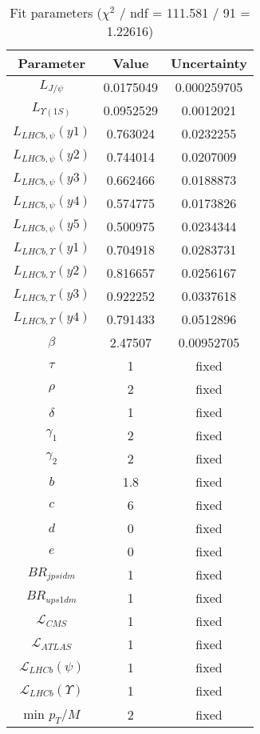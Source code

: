\begin{table}
\centering
\begin{tabular}{c|c|c}
Parameter & Value & Uncertainty \\
\hline
$L_{J/\psi}$ & 0.0175049 & 0.000259705 \\
$L_{\Upsilon(1S)}$ & 0.0952529 & 0.0012021 \\
$L_{LHCb,\psi}(y1)$ & 0.763024 & 0.0232255 \\
$L_{LHCb,\psi}(y2)$ & 0.744014 & 0.0207009 \\
$L_{LHCb,\psi}(y3)$ & 0.662466 & 0.0188873 \\
$L_{LHCb,\psi}(y4)$ & 0.574775 & 0.0173826 \\
$L_{LHCb,\psi}(y5)$ & 0.500975 & 0.0234344 \\
$L_{LHCb,\Upsilon}(y1)$ & 0.704918 & 0.0283731 \\
$L_{LHCb,\Upsilon}(y2)$ & 0.816657 & 0.0256167 \\
$L_{LHCb,\Upsilon}(y3)$ & 0.922252 & 0.0337618 \\
$L_{LHCb,\Upsilon}(y4)$ & 0.791433 & 0.0512896 \\
$\beta$ & 2.47507 & 0.00952705 \\
$\tau$ & 1 & fixed \\
$\rho$ & 2 & fixed \\
$\delta$ & 1 & fixed \\
$\gamma_1$ & 2 & fixed \\
$\gamma_2$ & 2 & fixed \\
$b$ & 1.8 & fixed \\
$c$ & 6 & fixed \\
$d$ & 0 & fixed \\
$e$ & 0 & fixed \\
$BR_{jpsidm}$ & 1 & fixed \\
$BR_{ups1dm}$ & 1 & fixed \\
$\mathcal L_{CMS}$ & 1 & fixed \\
$\mathcal L_{ATLAS}$ & 1 & fixed \\
$\mathcal L_{LHCb}(\psi)$ & 1 & fixed \\
$\mathcal L_{LHCb}(\Upsilon)$ & 1 & fixed \\
min $p_T/M$ & 2 & fixed \\
\end{tabular}
\caption{Fit parameters ($\chi^2$ / ndf = 111.581 / 91 = 1.22616)}
\end{table}

